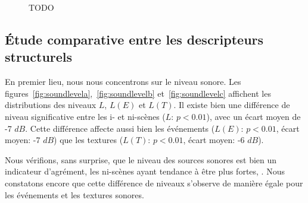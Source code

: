 \begin{figure}[t]
        \myfloatalign
       \caption[TODO]{TODO}\label{fig:xp2_A}
\end{figure}
 
\subsection{Étude comparative entre les descripteurs structurels}

En premier lieu, nous nous concentrons sur le niveau sonore. Les figures~\ref{fig:soundlevela},~\ref{fig:soundlevelb} et~\ref{fig:soundlevelc} affichent les distributions des niveaux $L$, $L(E)$ et $L(T)$. Il existe bien une différence de niveau  significative entre les i- et ni-scènes ($L$: $p<0.01$), avec un écart moyen de -7 $dB$. Cette différence affecte aussi bien les événements ($L(E)$: $p<0.01$, écart moyen: -7 $dB$) que les textures ($L(T)$: $p<0.01$, écart moyen: -6 $dB$). 

Nous vérifions, sans surprise, que le niveau des sources sonores est bien un indicateur d'agrément, les ni-scènes ayant tendance à être plus fortes,  . Nous constatons encore que cette différence de niveaux s'observe de manière égale pour les événements et les textures sonores. 

